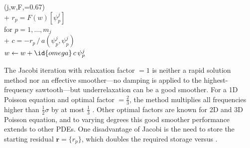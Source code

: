 \documentclass[letterpaper,final,12pt,reqno]{amsart}
\theoremstyle{claim}
\newcommand{\br}{\mathbf{r}}
\numberwithin{equation}{section}
\numberwithin{figure}{section}
\numberwithin{table}{section}
\numberwithin{theorem}{section}
\begin{document}
\begin{pseudo*} \label{ps:jacobi-sweep}
(j,w,F,=0.67)\text{:} \\+
    $r_p = F(w)[\psi_p^j]$ \qquad\qquad\qquad\qquad {} \\
    for $p=1,\dots,m_j$ \\+
        $\displaystyle c = - r_p \, \big/ \, a(\psi_p^j,\psi_p^j)$  \\
        $w \gets w + \id{omega} \,c \,\psi_p^j$
\end{pseudo*}

The Jacobi iteration with relaxation factor  $=1$ is neither a rapid solution method nor an effective smoother---no damping is applied to the highest-frequency sawtooth---but underrelaxation can be a good smoother.  For a 1D Poisson equation and optimal factor  $=\frac{2}{3}$, the method multiplies all frequencies higher than $\frac{1}{2} \sigma$ by at most $\frac{1}{3}$ \cite[Chapter 4]{Briggsetal2000}.  Other optimal factors are known for 2D and 3D Poisson equation, and to varying degrees this good smoother performance extends to other PDEs.  One disadvantage of Jacobi is the need to store the starting residual $\br = \{r_p\}$, which doubles the required storage versus .
\end{document}
